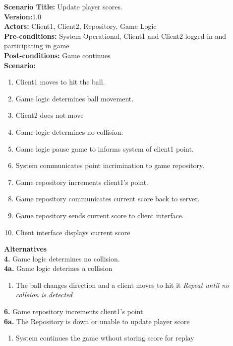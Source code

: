 \documentclass[letterpaper,12pt]{article}
\begin{document}
\noindent \textbf{Scenario Title:} Update player scores.\\
\textbf{Version:}1.0\\
\textbf{Actors:} Client1, Client2, Repository, Game Logic\\
\textbf{Pre-conditions:} System Operational, Client1 and Client2 logged in and participating in game \\
\textbf{Post-conditions:} Game continues\\
\textbf{Scenario:}
\begin{enumerate}
\item Client1 moves to hit the ball.
\item Game logic determines ball movement.
\item Client2 does not move 
\item Game logic determines no collision. 
\item Game logic pause game to informs system of client1 point.
\item System communicates point incrimination to game repository.
\item Game repository increments client1’s point.
\item Game repository communicates current score back to server.
\item Game repository sends current score to client interface.
\item Client interface displays current score
\end{enumerate}
\textbf{Alternatives}\\
\textbf{4.} Game logic determines no collision.  \\
\textbf{4a.} Game logic deterines a collision
\begin {enumerate}
\item The ball changes direction and a client moves to hit it
\emph {Repeat until no collsion is detected}
\end {enumerate}
\textbf{6.} Game repository increments client1’s point. \\
\textbf{6a.} The Repository is down or unable to update player score
\begin{enumerate}
\item System continues the game wthout storing score for replay
\end{enumerate}
\end{document}
